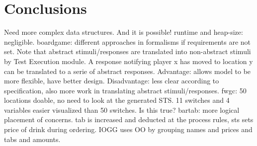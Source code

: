 \section{Conclusions}
Need more complex data structures. And it is possible!
runtime and heap-size: negligible.
boardgame: different approaches in formalisms if requirements are not set. Note that abstract stimuli/responses are translated into non-abstract stimuli by Test Execution module. A response notifying player x has moved to location y can be translated to a serie of abstract responses. Advantage: allows model to be more flexible, have better design. Disadvantage: less clear according to specification, also more work in translating abstract stimuli/responses.
fwgc: 50 locations doable, no need to look at the generated STS. 11 switches and 4 variables easier visualized than 50 switches. Is this true?
bartab: more logical placement of concerns. tab is increased and deducted at the process rules, sts sets price of drink during ordering. IOGG uses OO by grouping names and prices and tabs and amounts.
